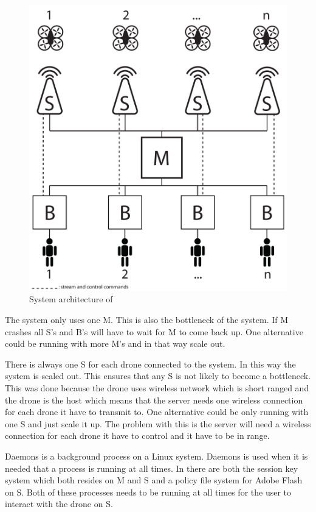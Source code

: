 \begin{figure}[htb]
    \centering 
    \includegraphics[width=\textwidth]{gfx/system_architecture.pdf}
    \caption{System architecture of \projectname{}}
    \label{fig:system_architecture}
\end{figure}

The system only uses one M. This is also the bottleneck of the system. If M crashes all S's and B's will have to wait for M to come back up.
One alternative could be running with more M's and in that way scale out.

There is always one S for each drone connected to the system. In this way the system is scaled out. This ensures that any S is not likely to become a bottleneck.
This was done because the drone uses wireless network which is short ranged and the drone is the host which means that the server needs one wireless connection for each drone it have to transmit to.
One alternative could be only running with one S and just scale it up. The problem with this is the server will need a wireless connection for each drone it have to control and it have to be in range.

Daemons is a background process on a Linux system.
Daemons is used when it is needed that a process is running at all times. In \projectname{} there are both the session key system which both resides on M and S and a policy file system for Adobe Flash on S. Both of these processes needs to be running at all times for the user to interact with the drone on S.

